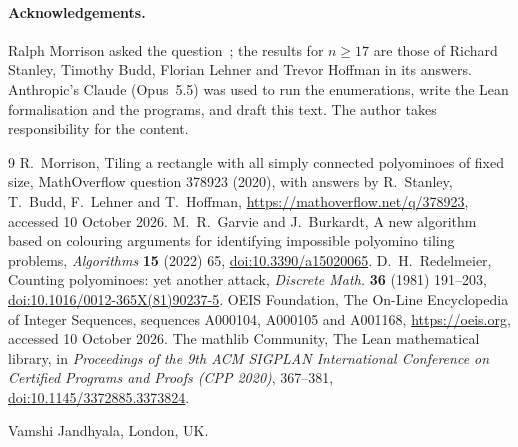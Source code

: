 \documentclass[11pt]{article}
\begin{document}
\paragraph{Acknowledgements.} Ralph Morrison asked the question~\cite{MO}; the results for $n\ge17$ are those of
Richard Stanley, Timothy Budd, Florian Lehner and Trevor Hoffman in its answers. Anthropic's Claude (Opus~5.5) was
used to run the enumerations, write the Lean formalisation and the programs, and draft this text. The author takes
responsibility for the content.

\begin{thebibliography}{9}
 R.~Morrison, Tiling a rectangle with all simply connected polyominoes of fixed size, MathOverflow
question 378923 (2020), with answers by R.~Stanley, T.~Budd, F.~Lehner and T.~Hoffman,
\url{https://mathoverflow.net/q/378923}, accessed 10 October 2026.
 M.~R.~Garvie and J.~Burkardt, A new algorithm based on colouring arguments for identifying impossible
polyomino tiling problems, \emph{Algorithms} \textbf{15} (2022) 65,
\href{https://doi.org/10.3390/a15020065}{doi:10.3390/a15020065}.
 D.~H.~Redelmeier, Counting polyominoes: yet another attack, \emph{Discrete Math.} \textbf{36}
(1981) 191--203, \href{https://doi.org/10.1016/0012-365X(81)90237-5}{doi:10.1016/0012-365X(81)90237-5}.
 OEIS Foundation, The On-Line Encyclopedia of Integer Sequences, sequences A000104, A000105 and
A001168, \url{https://oeis.org}, accessed 10 October 2026.
 The mathlib Community, The Lean mathematical library, in \emph{Proceedings of the 9th ACM
SIGPLAN International Conference on Certified Programs and Proofs (CPP 2020)}, 367--381,
\href{https://doi.org/10.1145/3372885.3373824}{doi:10.1145/3372885.3373824}.
\end{thebibliography}

\bigskip
\noindent Vamshi Jandhyala, London, UK.
\end{document}
